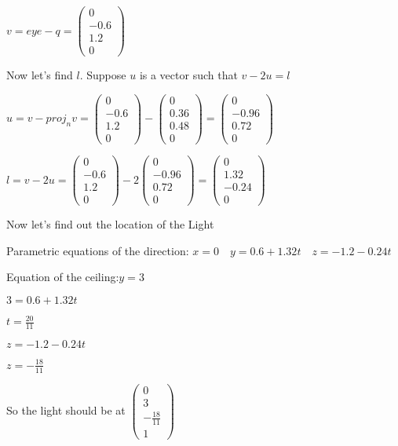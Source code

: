 \documentclass[12pt]{article}
\begin{document}
$v = eye - q = \begin{pmatrix}0 \\-0.6\\1.2\\0\end{pmatrix}$

Now let's find $l$. Suppose $u$ is a vector such that $v - 2u = l$

$u = v - proj_n v = \begin{pmatrix}0 \\-0.6\\1.2\\0\end{pmatrix}- \begin{pmatrix}0\\0.36\\0.48\\0\end{pmatrix} =\begin{pmatrix}0\\-0.96\\0.72\\0\end{pmatrix}$


$l = v-2u=\begin{pmatrix}0 \\-0.6\\1.2\\0\end{pmatrix}-2\begin{pmatrix}0 \\-0.96\\0.72\\0\end{pmatrix}=\begin{pmatrix}0 \\1.32\\-0.24\\0\end{pmatrix}$

Now let's find out the location of the Light

Parametric equations of the direction: $x=0 \quad y=0.6+1.32t \quad z=-1.2-0.24t$

Equation of the ceiling:$y=3$

$3=0.6+1.32t$

$t=\frac{20}{11}$

$z=-1.2 - 0.24t$

$z=-\frac{18}{11}$

So the light should be at $\begin{pmatrix}0\\3\\-\frac{18}{11}\\1\end{pmatrix}$
\end{document}
